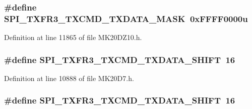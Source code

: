 \subsubsection[{\texorpdfstring{S\+P\+I\+\_\+\+T\+X\+F\+R3\+\_\+\+T\+X\+C\+M\+D\+\_\+\+T\+X\+D\+A\+T\+A\+\_\+\+M\+A\+SK}{SPI_TXFR3_TXCMD_TXDATA_MASK}}]{\setlength{\rightskip}{0pt plus 5cm}\#define S\+P\+I\+\_\+\+T\+X\+F\+R3\+\_\+\+T\+X\+C\+M\+D\+\_\+\+T\+X\+D\+A\+T\+A\+\_\+\+M\+A\+SK~0x\+F\+F\+F\+F0000u}\hypertarget{group___s_p_i___register___masks_ga5db2d61f529d80173f78729f46c098a9}{}\label{group___s_p_i___register___masks_ga5db2d61f529d80173f78729f46c098a9}


Definition at line 11865 of file M\+K20\+D\+Z10.\+h.

\subsubsection[{\texorpdfstring{S\+P\+I\+\_\+\+T\+X\+F\+R3\+\_\+\+T\+X\+C\+M\+D\+\_\+\+T\+X\+D\+A\+T\+A\+\_\+\+S\+H\+I\+FT}{SPI_TXFR3_TXCMD_TXDATA_SHIFT}}]{\setlength{\rightskip}{0pt plus 5cm}\#define S\+P\+I\+\_\+\+T\+X\+F\+R3\+\_\+\+T\+X\+C\+M\+D\+\_\+\+T\+X\+D\+A\+T\+A\+\_\+\+S\+H\+I\+FT~16}\hypertarget{group___s_p_i___register___masks_ga22a70393315807bfa3480a1892da3531}{}\label{group___s_p_i___register___masks_ga22a70393315807bfa3480a1892da3531}


Definition at line 10888 of file M\+K20\+D7.\+h.

\subsubsection[{\texorpdfstring{S\+P\+I\+\_\+\+T\+X\+F\+R3\+\_\+\+T\+X\+C\+M\+D\+\_\+\+T\+X\+D\+A\+T\+A\+\_\+\+S\+H\+I\+FT}{SPI_TXFR3_TXCMD_TXDATA_SHIFT}}]{\setlength{\rightskip}{0pt plus 5cm}\#define S\+P\+I\+\_\+\+T\+X\+F\+R3\+\_\+\+T\+X\+C\+M\+D\+\_\+\+T\+X\+D\+A\+T\+A\+\_\+\+S\+H\+I\+FT~16}\hypertarget{group___s_p_i___register___masks_ga22a70393315807bfa3480a1892da3531}{}\label{group___s_p_i___register___masks_ga22a70393315807bfa3480a1892da3531}


